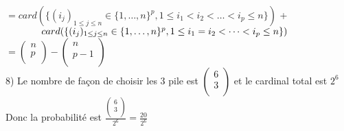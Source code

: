 \documentclass{article}
\newcommand\tab[1][1cm]{\hspace*{#1}}
\begin{document}
$= card(\{(i_j)_{1 \leq j \leq n} \in \{1, \dots, n\}^p, 1 \leq i_1 < i_2 < \dots < i_p \leq n\})$ + \\
$\tab[1.3cm] card(\{(i_j)_{1 \leq j \leq n} \in \{1, \dots, n\}^p, 1 \leq i_1 = i_2 < \dots < i_p \leq n\})$\\
$= \begin{pmatrix}
    n\\
    p\\
\end{pmatrix} - \begin{pmatrix}
    n\\
    p - 1\\
\end{pmatrix}$\\
8) Le nombre de façon de choisir les 3 pile est $\begin{pmatrix}
    6\\
    3\\
\end{pmatrix}$ et le cardinal total est $2^6$\\
Donc la probabilité est $\frac{\begin{pmatrix}
    6\\
    3\\
\end{pmatrix}}{2^6} = \frac{20}{2^6}$
\end{document}
